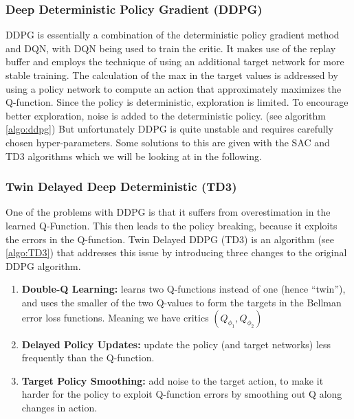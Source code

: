 \subsubsection{Deep Deterministic Policy Gradient (DDPG)} 
DDPG \cite{lillicrap2019continuouscontroldeepreinforcement} is essentially a combination of the deterministic policy
gradient method and DQN, with DQN being used to train the critic. It makes use of the replay buffer and employs the technique 
of using an additional target network for more stable training. The calculation of the max in the target values is addressed 
by using a policy network to compute an action that approximately maximizes the Q-function. Since the policy is deterministic, 
exploration is limited. To encourage better exploration, noise is added to the deterministic policy. 
(see algorithm \ref{algo:ddpg})\newline 
But unfortunately DDPG is quite unstable and requires carefully chosen hyper-parameters. 
Some solutions to this are given with the SAC and TD3 algorithms which we will be looking at in the following.

\subsubsection{Twin Delayed Deep Deterministic (TD3)}
One of the problems with DDPG is that it suffers from overestimation in the learned 
Q-Function. This then leads to the policy breaking, because it exploits the errors 
in the Q-function. Twin Delayed DDPG (TD3) \cite{fujimoto2018addressingfunctionapproximationerror}
is an algorithm (see \ref{algo:TD3}) that addresses this issue by introducing three changes to the original DDPG algorithm.
 \begin{enumerate}
    \item \textbf{Double-Q Learning:} learns two Q-functions instead of one (hence “twin”), and uses
    the smaller of the two Q-values to form the targets in the Bellman error loss functions. 
    Meaning we have critics $(Q_{\phi_1},Q_{\phi_2})$
    \item \textbf{Delayed Policy Updates:} update the policy (and target networks) less frequently than the Q-function.
    \item \textbf{Target Policy Smoothing:} add noise to the target action, to make it harder for the policy to exploit
    Q-function errors by smoothing out Q along changes in action.
 \end{enumerate}

